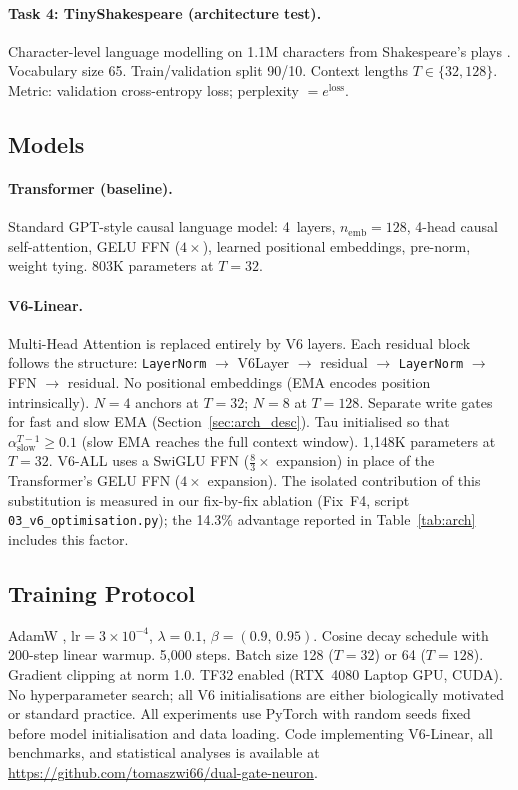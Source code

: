 \documentclass[11pt,a4paper]{article}
\begin{document}
\paragraph{Task 4: TinyShakespeare (architecture test).}
Character-level language modelling on 1.1M characters from
Shakespeare's plays \citep{karpathy2015unreasonable}. Vocabulary size 65.
Train/validation split 90/10. Context lengths $T\in\{32, 128\}$.
Metric: validation cross-entropy loss; perplexity $=e^{\mathrm{loss}}$.

\subsection{Models}

\paragraph{Transformer (baseline).}
Standard GPT-style causal language model: 4~layers,
$n_\mathrm{emb}=128$, 4-head causal self-attention, GELU FFN ($4\times$),
learned positional embeddings, pre-norm, weight tying.
803K parameters at $T=32$.

\paragraph{V6-Linear.}
Multi-Head Attention is replaced entirely by V6 layers. Each residual
block follows the structure:
\texttt{LayerNorm} $\to$ V6Layer $\to$ residual $\to$
\texttt{LayerNorm} $\to$ FFN $\to$ residual.
No positional embeddings (EMA encodes position intrinsically).
$N=4$ anchors at $T=32$; $N=8$ at $T=128$.
Separate write gates for fast and slow EMA (Section~\ref{sec:arch_desc}).
Tau initialised so that $\alpha_\mathrm{slow}^{T-1}\geq 0.1$
(slow EMA reaches the full context window).
1,148K parameters at $T=32$.
V6-ALL uses a SwiGLU FFN \citep{shazeer2020glu} ($\frac{8}{3}\times$ expansion)
in place of the Transformer's GELU FFN ($4\times$ expansion).
The isolated contribution of this substitution is measured in our
fix-by-fix ablation (Fix~F4, script \texttt{03\_v6\_optimisation.py});
the 14.3\% advantage reported in Table~\ref{tab:arch} includes this factor.

\subsection{Training Protocol}

AdamW \citep{loshchilov2017decoupled},
$\mathrm{lr}=3\times10^{-4}$, $\lambda=0.1$,
$\beta=(0.9,\,0.95)$.
Cosine decay schedule with 200-step linear warmup.
5,000 steps. Batch size 128 ($T=32$) or 64 ($T=128$).
Gradient clipping at norm 1.0.
TF32 enabled (RTX~4080 Laptop GPU, CUDA).
No hyperparameter search; all V6 initialisations are either
biologically motivated or standard practice.
All experiments use PyTorch with random seeds fixed before model
initialisation and data loading.
Code implementing V6-Linear, all benchmarks, and statistical analyses
is available at \url{https://github.com/tomaszwi66/dual-gate-neuron}.
\end{document}
